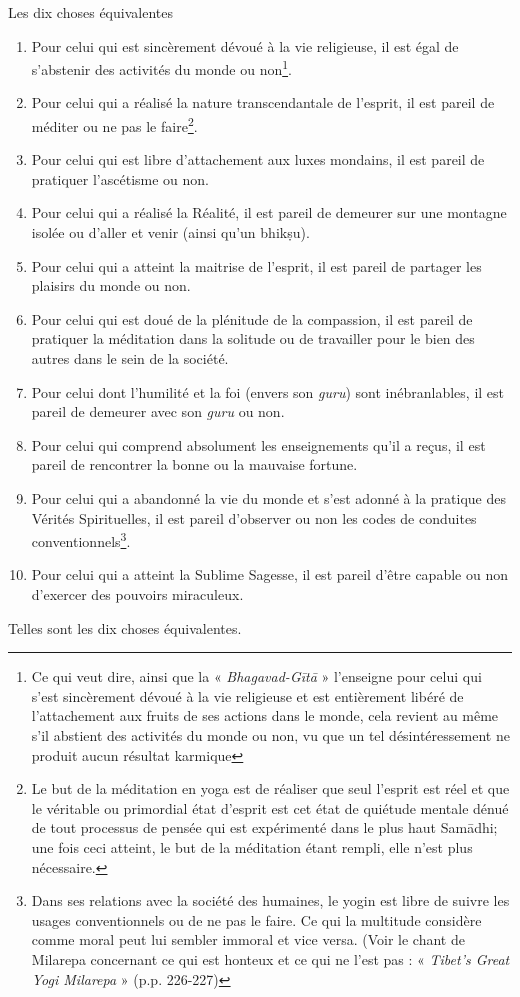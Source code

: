 \documentclass[10pt]{book}
\makeatletter
\renewcommand{\section}{\@startsection{section}{0}{0mm}
   {\baselineskip}
   {\baselineskip}{\normalfont\normalsize\scshape\centering}
}
\makeatother
\begin{document}
\section{Les dix choses équivalentes}
\begin{enumerate}[1.-]
\item Pour celui qui est sincèrement dévoué à la vie religieuse, il est égal de s'abstenir des activités du monde ou non\footnote{Ce qui veut dire, ainsi que la « \textit{Bhagavad-Gītā} » l'enseigne pour celui qui s'est sincèrement dévoué à la vie religieuse et est entièrement libéré de l'attachement aux fruits de ses actions dans le monde, cela revient au même s'il abstient des activités du monde ou non, vu que un tel désintéressement ne produit aucun résultat karmique}.
\item Pour celui qui a réalisé la nature transcendantale de l'esprit, il est pareil de méditer ou ne pas le faire\footnote{Le but de la méditation en yoga est de réaliser que seul l'esprit est réel et que le véritable ou primordial état d'esprit est cet état de quiétude mentale dénué de tout processus de pensée qui est expérimenté dans le plus haut Samādhi; une fois ceci atteint, le but de la méditation étant rempli, elle n'est plus nécessaire.}.
\item Pour celui qui est libre d'attachement aux luxes mondains, il est pareil de pratiquer l'ascétisme ou non.
\item Pour celui qui a réalisé la Réalité, il est pareil de demeurer sur une montagne isolée ou d'aller et venir (ainsi qu'un bhikṣu).
\item Pour celui qui a atteint la maitrise de l'esprit, il est pareil de partager les plaisirs du monde ou non.
\item Pour celui qui est doué de la plénitude de la compassion, il est pareil de pratiquer la méditation dans la solitude ou de travailler pour le bien des autres dans le sein de la société.
\item Pour celui dont l'humilité et la foi (envers son \textit{guru}) sont inébranlables, il est pareil de demeurer avec son \textit{guru} ou non.
\item Pour celui qui comprend absolument les enseignements qu'il a reçus, il est pareil de rencontrer la bonne ou la mauvaise fortune.
\item Pour celui qui a abandonné la vie du monde et s'est adonné à la pratique des Vérités Spirituelles, il est pareil d'observer ou non les codes de conduites conventionnels\footnote{Dans ses relations avec la société des humaines, le yogin est libre de suivre les usages conventionnels ou de ne pas le faire. Ce qui la multitude considère comme moral peut lui sembler immoral et vice versa. (Voir le chant de Milarepa concernant ce qui est honteux et ce qui ne l'est pas : « \textit{Tibet's Great Yogi Milarepa} » (p.p. 226-227)}.
\item Pour celui qui a atteint la Sublime Sagesse, il est pareil d'être capable ou non d'exercer des pouvoirs miraculeux.
\end{enumerate}
Telles sont les dix choses équivalentes.
\end{document}

